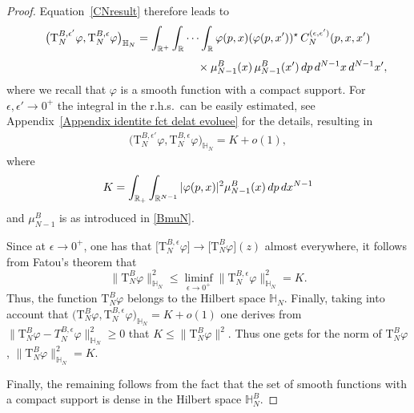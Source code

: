 \documentclass[11pt]{article}
\numberwithin{equation}{section}
\numberwithin{equation}{section}
\begin{document}
\begin{proof}
Equation~\eqref{CNresult} therefore leads to
\begin{gather*}
\big( \mathrm T_{N}^{B,\epsilon'} \varphi , \mathrm T_{N}^{B,\epsilon} \varphi \big)_{\mathbb H_N}
 =\int_{\mathbb R^+} \int_{\mathbb R}\cdots \int_{\mathbb R}
\varphi(p, x)(\varphi(p, x'))^\star \,
C_N^{( \epsilon, \epsilon')}(p, x, x')
\\[1ex] \hphantom{\big( \mathrm T_{N}^{B,\epsilon'} \varphi , \mathrm T_{N}^{B,\epsilon} \varphi \big)_{\mathbb H_N}
 =\int_{\mathbb R^+} \int_{\mathbb R}\cdots \int_{\mathbb R}}
{}\times \mu_{N-1}^{B}( x) \, \mu_{N-1}^{B}( x') \, {\rm d}p\, {\rm d}^{N-1} x\, {\rm d}^{N-1} x',
\end{gather*}
where we recall that $ \varphi$ is a smooth function with a compact support. For $ \epsilon,\epsilon'\to 0^+$ the integral in the r.h.s.\ can
be easily estimated, see Appendix~\ref{Appendix identite fct delat evoluee} for the details, resulting in
\begin{gather*}
\big( \mathrm T_{N}^{B,\epsilon'} \varphi , \mathrm T_{N}^{B,\epsilon} \varphi \big)_{\mathbb H_N}= K+ o(1),
\end{gather*}
where
\begin{gather*}
K=\int_{\mathbb R_+}\int_{\mathbb R^{N-1}}
 |\varphi(p, x)|^2 \mu_{N-1}^B( x) \,{\rm d}p \, {\rm d}x ^{N-1}
\end{gather*}
and $\mu_{N-1}^{B}$ is as introduced in \eqref{BmuN}.

Since at $ \epsilon\to 0^+$, one has that $\big[ \mathrm T_{N}^{B,\epsilon}\varphi\big] \rightarrow \big[ \mathrm T_{N}^{B}\varphi\big]( z)$ almost
everywhere, it follows from Fatou's theorem that
\[
\big\| \mathrm T_{N}^{B}\varphi \big\|^2_{\mathbb H_N} \leq \liminf_{ \epsilon\to 0^+}\big\|\mathrm T_{N}^{B,\epsilon}\varphi\big\|^2_{\mathbb H_N} =K.
\]
Thus, the function $\mathrm T_{N}^{B}\varphi$ belongs to the Hilbert space $\mathbb H_N$.
Finally, taking into account that
$\big(\mathrm T_{N}^{B}\varphi,\mathrm T_{N}^{B,\epsilon}\varphi\big)_{\mathbb H_N}=K+o(1)$
one derives from $\big\|\mathrm T_{N}^{B}\varphi -T_{N}^{B,\epsilon}\varphi\big\|^2_{\mathbb H_N}\geq0$ that
$ K\leq\big\|\mathrm T_{N}^{B}\varphi\big\|^2 $. Thus one gets for the norm of $\mathrm T_{N}^{B}\varphi$,
$\big\|\mathrm T_{N}^{B}\varphi\big\|^2_{\mathbb H_N}=K.$

Finally, the remaining follows from the fact that the set of smooth functions with a compact support is dense in the Hilbert space $\mathbb H_N^{B}$.
\end{proof}
\end{document}
